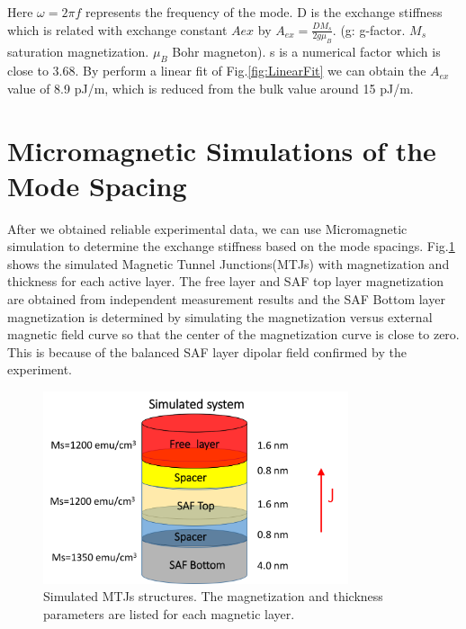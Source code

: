 Here $\omega = 2\pi  f$ represents the frequency of the mode. D is the exchange stiffness which is related with exchange constant $Aex$ by $A_{ex} = \frac{D M_s}{2 g \mu_B} $. (g: g-factor. $M_s$ saturation magnetization. $\mu_B$ Bohr magneton). s is a numerical factor which is close to 3.68. By perform a linear fit of Fig.\ref{fig:LinearFit} we can obtain the $A_{ex}$ value of 8.9 pJ/m, which is reduced from the bulk value around 15 pJ/m.

\clearpage


\section{Micromagnetic Simulations of the Mode Spacing}

After we obtained reliable experimental data, we can use Micromagnetic simulation to determine the exchange stiffness based on the mode spacings. Fig.\ref{fig:simulated} shows the simulated Magnetic Tunnel Junctions(MTJs) with magnetization and thickness for each active layer. The free layer and SAF top layer magnetization are obtained from independent measurement results and the SAF Bottom layer magnetization is determined by simulating the magnetization versus external magnetic field curve so that the center of the magnetization curve is close to zero. This is because of the balanced SAF layer dipolar field confirmed by the experiment.

\begin{figure}[!ht]
  \centering
  \includegraphics[width=0.8\textwidth]{fig/2018/simulated}
   \caption{Simulated MTJs structures. The magnetization and thickness parameters are listed for each magnetic layer.}
  \label{fig:simulated}
\end{figure}

